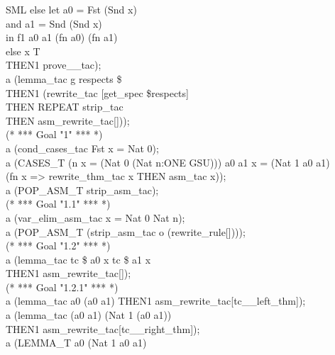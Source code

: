 {\begin{GFT}{SML}
\+	else	let a0 = Fst (Snd x)\\
\+		and a1 = Snd (Snd x)\\
\+		in f1 a0 a1 (fn a0) (fn a1)\\
\+  else \MMM{\epsilon}x\MMM{\bullet} T\PrKO{}\\
\+	THEN1 prove\_\MMM{\exists}\_tac);\\
\+a (lemma\_tac \PrKM{}g respects \$\MMM{\in}\PrKO{}\\
\+	THEN1 (rewrite\_tac [get\_spec \PrKM{}\$respects\PrKO{}]\\
\+		THEN REPEAT strip\_tac\\
\+		THEN asm\_rewrite\_tac[]));\\
\+(* *** Goal "1" *** *)\\
\+a (cond\_cases\_tac \PrKM{}Fst x = Nat 0\PrKO{});\\
\+a (CASES\_T \PrKM{}(\MMM{\exists}n\MMM{\bullet} x = (Nat 0 \MMM{\mapsto} (Nat n:ONE GSU))) \MMM{\lor} \MMM{\exists}a0 a1\MMM{\bullet} x = (Nat 1 \MMM{\mapsto} a0 \MMM{\mapsto} a1)\PrKO{}\\
\+	(fn x => rewrite\_thm\_tac x THEN asm\_tac x));\\
\+a (POP\_ASM\_T strip\_asm\_tac);\\
\+(* *** Goal "1.1" *** *)\\
\+a (var\_elim\_asm\_tac \PrKM{}x = Nat 0 \MMM{\mapsto} Nat n\PrKO{});\\
\+a (POP\_ASM\_T (strip\_asm\_tac o (rewrite\_rule[])));\\
\+(* *** Goal "1.2" *** *)\\
\+a (lemma\_tac \PrKM{}tc \$\MMM{\in} a0 x \MMM{\land} tc \$\MMM{\in} a1 x\PrKO{}\\
\+	THEN1 asm\_rewrite\_tac[]);\\
\+(* *** Goal "1.2.1" *** *)\\
\+a (lemma\_tac \PrKM{}a0 \MMM{\in}\PrJL{+} (a0 \MMM{\mapsto} a1)\PrKO{} THEN1 asm\_rewrite\_tac[tc\MMM{\in}\_\MMM{\mapsto}\_left\_thm]);\\
\+a (lemma\_tac \PrKM{}(a0 \MMM{\mapsto} a1) \MMM{\in}\PrJL{+} (Nat 1 \MMM{\mapsto} (a0 \MMM{\mapsto} a1))\PrKO{}\\
\+	THEN1 asm\_rewrite\_tac[tc\MMM{\in}\_\MMM{\mapsto}\_right\_thm]);\\
\+a (LEMMA\_T \PrKM{}a0 \MMM{\in}\PrJL{+} (Nat 1 \MMM{\mapsto} a0 \MMM{\mapsto} a1)\PrKO{}\\

\end{GFT}}
